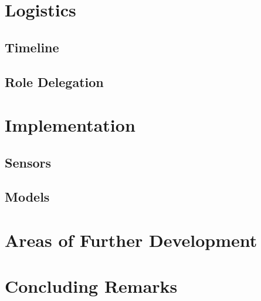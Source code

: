\documentclass{article}
\begin{document}
\section{Logistics}%
\label{sec:logistics}

\subsection{Timeline}%
\label{subsec:timeline}

\subsection{Role Delegation}%
\label{subsec:delegation}

\section{Implementation}%
\label{sec:implementation}

\subsection{Sensors}%
\label{subsec:sensors}

\subsection{Models}%
\label{subsec:label}

\section{Areas of Further Development}%
\label{sec:development}

\section{Concluding Remarks}%
\label{sec:conclusion}
\end{document}
